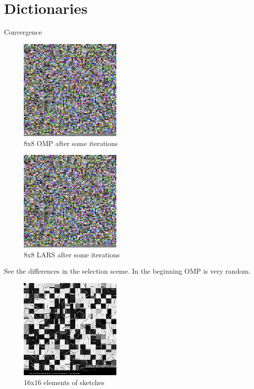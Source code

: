 \section{Dictionaries}

Convergence

\begin{figure}[h]
\centering
\includegraphics[width = 0.44\textwidth]{images/8_4000_10000_10_lasso.png} 
\caption{8x8 OMP after some iterations}
\label{fig:8_4000_lasso}
\end{figure}

\begin{figure}[h]
\centering
\includegraphics[width = 0.44\textwidth]{images/8_4000_10000_10_lasso.png} 
\caption{8x8 LARS after some iterations}
\label{fig:8_4000_lasso}
\end{figure}

See the differences in the selection sceme.
In the beginning OMP is very random.

\begin{figure}[h]
\centering
\includegraphics[width = 0.44\textwidth]{images/16_1000_5000_10lasso_sketches.png}
\caption{16x16 elements of sketches}
\label{fig:16_1000_lasso}
\end{figure}

